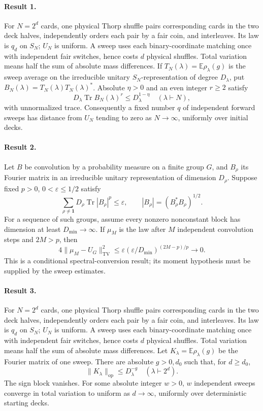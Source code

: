 \documentclass[11pt]{article}
\begin{document}
\paragraph{Result 1.} For $N=2^d$ cards, one physical Thorp shuffle pairs corresponding cards in the two deck halves, independently orders each pair by a fair coin, and interleaves. Its law is $q_d$ on $S_N$; $U_N$ is uniform. A sweep uses each binary-coordinate matching once with independent fair switches, hence costs $d$ physical shuffles. Total variation means half the sum of absolute mass differences. If $T_N(\lambda)=\mathbb E\rho_\lambda(g)$ is the sweep average on the irreducible unitary $S_N$-representation of degree $D_\lambda$, put $B_N(\lambda)=T_N(\lambda)T_N(\lambda)^*$. Absolute $\eta>0$ and an even integer $r\ge2$ satisfy
\[
 D_\lambda\operatorname{Tr}B_N(\lambda)^r\le D_\lambda^{1-\eta}
 \quad(\lambda\vdash N),
\]
with unnormalized trace. Consequently a fixed number $q$ of independent forward sweeps has distance from $U_N$ tending to zero as $N\to\infty$, uniformly over initial decks.

\paragraph{Result 2.} Let $B$ be convolution by a probability measure on a finite group $G$, and $B_\rho$ its Fourier matrix in an irreducible unitary representation of dimension $D_\rho$. Suppose fixed $p>0$, $0<\varepsilon\le1/2$ satisfy
\[
 \sum_{\rho\ne\mathbf1}D_\rho\operatorname{Tr}|B_\rho|^p\le\varepsilon,
 \qquad |B_\rho|=(B_\rho^*B_\rho)^{1/2}.
\]
For a sequence of such groups, assume every nonzero nonconstant block has dimension at least $D_{\min}\to\infty$. If $\mu_M$ is the law after $M$ independent convolution steps and $2M>p$, then
\[
 4\|\mu_M-U_G\|_{\mathrm{TV}}^2
 \le\varepsilon(\varepsilon/D_{\min})^{(2M-p)/p}\longrightarrow0.
\]
This is a conditional spectral-conversion result; its moment hypothesis must be supplied by the sweep estimates.

\paragraph{Result 3.} For $N=2^d$ cards, one physical Thorp shuffle pairs corresponding cards in the two deck halves, independently orders each pair by a fair coin, and interleaves. Its law is $q_d$ on $S_N$; $U_N$ is uniform. A sweep uses each binary-coordinate matching once with independent fair switches, hence costs $d$ physical shuffles. Total variation means half the sum of absolute mass differences. Let $K_\lambda=\mathbb E\rho_\lambda(g)$ be the Fourier matrix of one sweep. There are absolute $g>0,d_0$ such that, for $d\ge d_0$,
\[
 \|K_\lambda\|_{\mathrm{op}}\le D_\lambda^{-g}\quad(\lambda\vdash 2^d).
\]
The sign block vanishes. For some absolute integer $w>0$, $w$ independent sweeps converge in total variation to uniform as $d\to\infty$, uniformly over deterministic starting decks.
\end{document}
